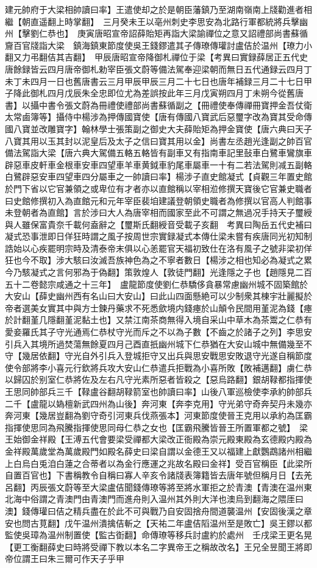 建元帥府于大梁相帥讀曰率】王遣使却之於是朝臣藩鎮乃至湖南嶺南上牋勸進者相繼【朝直遥翻上時掌翻】　三月癸未王以亳州刺史李思安為北路行軍都統將兵擊幽州【擊劉仁恭也】　庚寅唐昭宣帝詔薛貽矩再詣大梁諭禪位之意又詔禮部尚書蘇循齎百官牋詣大梁　鎮海鎮東節度使吳王錢鏐遣其子傳璙傳瓘討盧佶於温州【璙力小翻又力弔翻佶其吉翻】　甲辰唐昭宣帝降御札禪位于梁【考異曰實録薛居正五代史唐餘録皆云四月唐帝御札勅宰臣張文蔚等備法駕奉迎梁朝而無日五代通録云四月丁未丁未四月一日也舊唐書云三月甲辰甲辰三月二十七日也唐年補録三月二十七日甲子降此御札四月戊辰朱全忠即位尤為差誤按此年三月戊寅朔四月丁未朔今從舊唐書】以攝中書令張文蔚為冊禮使禮部尚書蘇循副之【冊禮使奉傳禪冊寶押金吾仗衛太常鹵簿等】攝侍中楊涉為押傳國寶使【唐有傳國八寶武后惡璽字改為寶其受命傳國八寶並改雕寶字】翰林學士張策副之御史大夫薛貽矩為押金寶使【唐六典曰天子八寶其用以玉其封以泥皇后及太子之信曰寶其用以金】尚書左丞趙光逢副之帥百官備法駕詣大梁【唐六典大駕備五輅五輅皆有副車又有指南車記里鼔車白鷺車鸞旗車辟惡車皮軒車金根車安車四望車羊車黄鉞車豹尾車屬車一十有二若法駕則减五副輅白鷺辟惡安車四望車四分屬車之一帥讀曰率】楊涉子直史館凝式【貞觀三年置史館於門下省以它官兼領之或卑位有才者亦以直館稱以宰相涖修撰天寶後它官兼史職者曰史館修撰初入為直館元和元年宰臣裴垍建議登朝領史職者為修撰以官高人判館事未登朝者為直館】言於涉曰大人為唐宰相而國家至此不可謂之無過况手持天子璽綬與人雖保富貴奈千載何盍辭之【璽斯氏翻綬音受載子亥翻　考異曰陶岳五代史補曰凝式恐事泄即日佯狂時謂之風子按周世宗實録凝式本傳仕梁未嘗有疾唐同光初知制誥始以心疾罷明宗時及清泰帝末俱以心恙罷官天福初致仕在洛有風子之號非梁初佯狂也今不取】涉大駭曰汝滅吾族神色為之不寧者數日【楊涉之相也知必為凝式之累今乃駭凝式之言何邪為于偽翻】策敦煌人【敦徒門翻】光逢隱之子也【趙隱見二百五十二卷懿宗咸通之十三年】　盧龍節度使劉仁恭驕侈貪暴常慮幽州城不固築館於大安山【薛史幽州西有名山曰大安山】曰此山四面懸絶可以少制衆其棟宇壯麗擬於帝者選美女實其中與方士鍊丹藥求不死悉歛境内錢瘞於山顛令民間用堇泥為錢【瘞於計翻堇几隱翻堇泥黏土也】又禁江南茶商無得入境自采山中草木為茶鬻之仁恭有愛妾羅氏其子守光通焉仁恭杖守光而斥之不以為子數【不齒之於諸子之列】李思安引兵入其境所過焚蕩無餘夏四月己酉直扺幽州城下仁恭猶在大安山城中無備幾至不守【幾居依翻】守光自外引兵入登城拒守又出兵與思安戰思安敗退守光遂自稱節度使令部將李小喜元行欽將兵攻大安山仁恭遣兵拒戰為小喜所敗【敗補邁翻】虜仁恭以歸囚於别室仁恭將佐及左右凡守光素所惡者皆殺之【惡烏路翻】銀胡䩮都指揮使王思同帥部兵三千【䩮盧谷翻胡䩮箭室也帥讀曰率】山後八軍巡檢使李承約帥部兵二千【盧龍以媯檀新武四州為山後】奔河東【奔李克用】守光弟守奇奔契丹未幾亦奔河東【幾居豈翻為劉守奇引河東兵伐燕張本】河東節度使晉王克用以承約為匡霸指揮使思同為飛騰指揮使思同母仁恭之女也【匡霸飛騰皆晉王所置軍都之號】　梁王始御金祥殿【王溥五代會要梁受禪都大梁改正衙殿為崇元殿東殿為玄德殿内殿為金祥殿萬歲堂為萬歲殿門如殿名薛史曰梁自謂以金德王又以福建上獻鸚鵡諸州相繼上白烏白兎洎白蓮之合蒂者以為金行應運之兆故名殿曰金祥】受百官稱臣【此梁所自置百官也】下書稱教令自稱曰寡人辛亥令諸牋表簿籍皆去唐年號但稱月日【去羌呂翻】丙辰張文蔚等至大梁盧佶聞錢傳璙等將至將水軍拒之於青澳【青澳在温州東北海中俗謂之青澳門由青澳門而進舟則入温州其外則大洋也澳烏到翻海之隈厓曰澳】錢傳瓘曰佶之精兵盡在於此不可與戰乃自安固捨舟間道襲温州【安固後漢之章安也問古莧翻】戊午温州潰擒佶斬之【天祐二年盧佶䧟温州至是敗亡】吳王鏐以都監使吳璋為温州制置使【監古衘翻】命傳璙等移兵討盧約於處州　壬戌梁王更名晃【更工衡翻薛史曰時將受禪下教以本名二字異帝王之稱故改名】王兄全昱聞王將即帝位謂王曰朱三爾可作天子乎甲